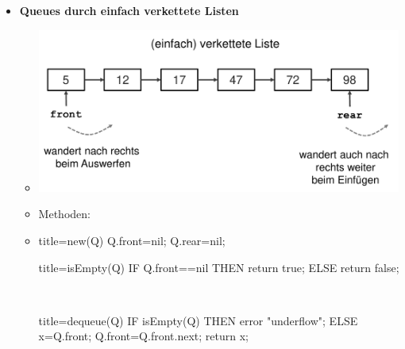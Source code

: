 \documentclass[
    12pt,
    a4paper,
    ngerman,
    color=3b,%
    marginpar=false,
    colorback=false,
    leqno,
]{tudaexercise}
\begin{document}
\begin{itemize}
          \pagebreak

    \item \textbf{Queues durch einfach verkettete Listen}
          \begin{itemize}
              \item[] \includegraphics[width=12cm]{pictures/queuesListe1.pdf}
              \item[] Methoden:
              \item[] %
                    \begin{minipage}[t]{.4\textwidth}
                        \begin{ccode}[autogobble]{title={new(Q)}}
                            Q.front=nil;
                            Q.rear=nil;
                        \end{ccode}
                    \end{minipage}
                    \begin{minipage}[t]{.4\textwidth}
                        \begin{ccode}[autogobble]{title={isEmpty(Q)}}
                            IF Q.front==nil THEN
                                return true;
                            ELSE
                                return false;
                        \end{ccode}
                    \end{minipage}
                    \\
                    \begin{minipage}[t]{.4\textwidth}
                        \begin{ccode}[autogobble]{title={dequeue(Q)}}
                            IF isEmpty(Q) THEN
                                error "underflow";
                            ELSE
                                x=Q.front;
                                Q.front=Q.front.next;
                                return x;
                        \end{ccode}

\end{minipage}
\end{itemize}
\end{itemize}
\end{document}
